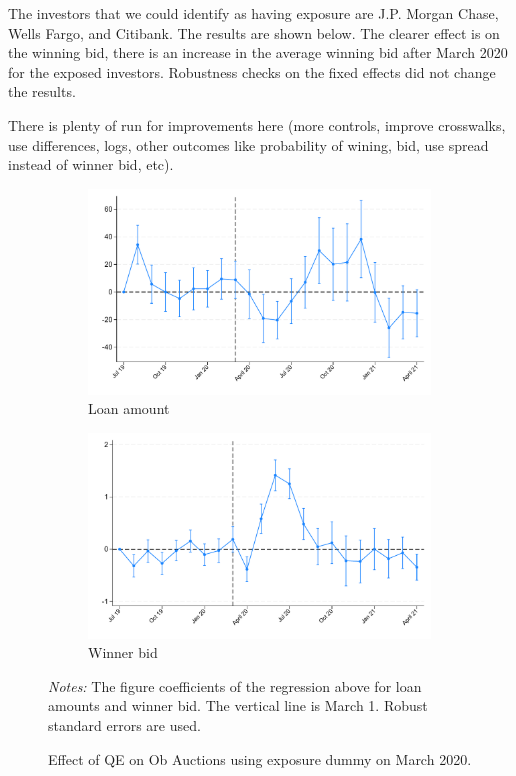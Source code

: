 \documentclass[11pt,a4paper]{article}
\begin{document}
The investors that we could identify as having exposure are J.P. Morgan Chase, Wells Fargo, and Citibank. The results are shown below.  The clearer effect is on the winning bid, there is an increase in the average winning bid after March 2020 for the exposed investors. Robustness checks on the fixed effects did not change the results.

There is plenty of run for improvements here (more controls, improve crosswalks, use differences, logs, other outcomes like probability of wining, bid, use spread instead of winner bid, etc).
\begin{figure}[h]
    \centering
    \begin{subfigure}[b]{0.49\textwidth}
        \includegraphics[width=0.998\textwidth]{../results/figures/did_loan_amount_exposure_march_dummy.pdf}
        \caption{ Loan amount }\label{fig:loan_amount}
       \end{subfigure}
       \begin{subfigure}[b]{0.49\textwidth}
        \includegraphics[width=0.998\textwidth]{../results/figures/did_winner_bid_exposure_march_dummy.pdf}
        \caption{ Winner bid }\label{fig:winner_bid}
       \end{subfigure}
       \caption{Effect of QE on Ob Auctions using exposure dummy on March 2020.}\label{fig:did_exp_amount}
     \begin{minipage}{\textwidth}
        \footnotesize{\textit{Notes:}  The figure coefficients of the regression above for loan amounts and winner bid. The vertical line is March 1.  Robust standard errors are used. }
        \end{minipage}
  \end{figure}
  
\end{document}
